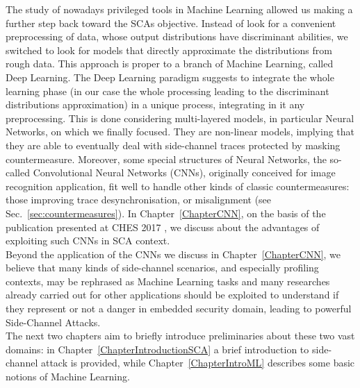 The study of nowadays privileged tools in Machine Learning allowed us making a further step back toward the SCAs objective. Instead of look for a convenient preprocessing of data, whose output distributions have discriminant abilities, we switched to look for models that directly approximate the distributions from rough data. This approach is proper to a branch of Machine Learning, called Deep Learning. The Deep Learning paradigm suggests to integrate the whole learning phase (in our case the whole processing leading to the discriminant distributions approximation) in a unique process, integrating in it any preprocessing. This is done considering multi-layered models, in particular Neural Networks, on which we finally focused. They are non-linear models, implying that they are able to eventually deal with side-channel traces protected by masking countermeasure. Moreover, some special structures of Neural Networks, the so-called Convolutional Neural Networks (CNNs), originally conceived for image recognition application, fit well to handle other kinds of classic countermeasures: those improving trace desynchronisation, or misalignment (see Sec.~\ref{sec:countermeasures}). In Chapter~\ref{ChapterCNN}, on the basis of the publication presented at CHES 2017 \cite{DBLP:conf/ches/CagliDP17}, we discuss about the advantages of exploiting such CNNs in SCA context.\\

Beyond the application of the CNNs we discuss in Chapter~\ref{ChapterCNN}, we believe that many kinds of side-channel scenarios, and especially profiling contexts, may be rephrased as Machine Learning tasks and many researches already carried out for other applications should be exploited to understand if they represent or not a danger in embedded security domain, leading to powerful Side-Channel Attacks. \\
%



The next two chapters aim to briefly introduce preliminaries about these two vast domains: in Chapter~\ref{ChapterIntroductionSCA}  a brief introduction to side-channel attack is provided, while Chapter~\ref{ChapterIntroML} describes some basic notions of Machine Learning.